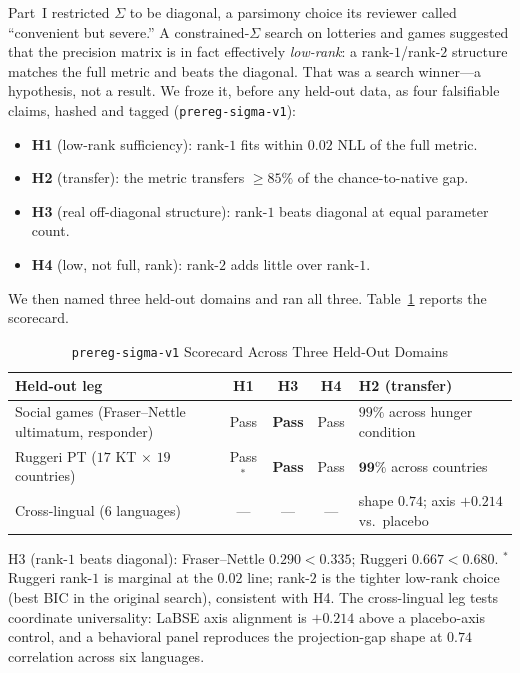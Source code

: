 \documentclass[journal]{IEEEtran}
\begin{document}
Part~I restricted $\Sigma$ to be diagonal, a parsimony choice its reviewer called ``convenient but severe.''
A constrained-$\Sigma$ search on lotteries and games suggested that the precision matrix is in fact effectively \emph{low-rank}: a rank-$1$/rank-$2$ structure matches the full metric and beats the diagonal.
That was a search winner---a hypothesis, not a result.
We froze it, before any held-out data, as four falsifiable claims, hashed and tagged (\texttt{prereg-sigma-v1}):
\begin{itemize}
    \item \textbf{H1} (low-rank sufficiency): rank-$1$ fits within $0.02$ NLL of the full metric.
    \item \textbf{H2} (transfer): the metric transfers $\geq85\%$ of the chance-to-native gap.
    \item \textbf{H3} (real off-diagonal structure): rank-$1$ beats diagonal at equal parameter count.
    \item \textbf{H4} (low, not full, rank): rank-$2$ adds little over rank-$1$.
\end{itemize}
We then named three held-out domains and ran all three.
Table~\ref{tab:lowrank} reports the scorecard.

\begin{table}[!t]
\renewcommand{\arraystretch}{1.2}
\caption{\texttt{prereg-sigma-v1} Scorecard Across Three Held-Out Domains}
\label{tab:lowrank}
\centering
\begin{tabular}{@{}p{} c c c p{}@{}}
\toprule
\textbf{Held-out leg} & \textbf{H1} & \textbf{H3} & \textbf{H4} & \textbf{H2 (transfer)} \\
\midrule
Social games (Fraser--Nettle ultimatum, responder)~\cite{fraser2020} & Pass & \textbf{Pass} & Pass & $99\%$ across hunger condition \\
Ruggeri PT ($17$ KT $\times$ $19$ countries)~\cite{ruggeri2020} & Pass$^{*}$ & \textbf{Pass} & Pass & $\mathbf{99\%}$ across countries \\
Cross-lingual ($6$ languages) & --- & --- & --- & shape $0.74$; axis $+0.214$ vs.\ placebo \\
\bottomrule
\end{tabular}
\begin{flushleft}
\footnotesize{H3 (rank-$1$ beats diagonal): Fraser--Nettle $0.290<0.335$; Ruggeri $0.667<0.680$. $^{*}$Ruggeri rank-$1$ is marginal at the $0.02$ line; rank-$2$ is the tighter low-rank choice (best BIC in the original search), consistent with H4. The cross-lingual leg tests coordinate universality: LaBSE axis alignment is $+0.214$ above a placebo-axis control, and a behavioral panel reproduces the projection-gap shape at $0.74$ correlation across six languages.}
\end{flushleft}
\end{table}
\end{document}
